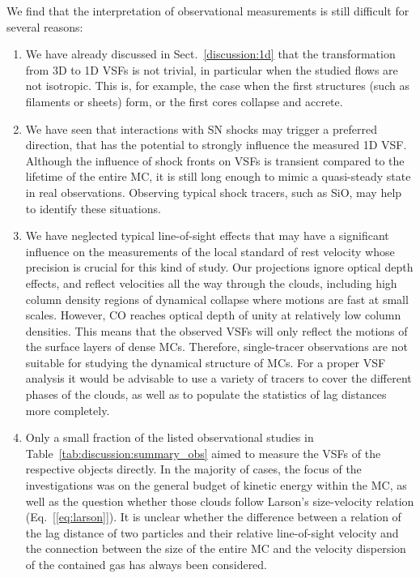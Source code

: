 We find that the interpretation of observational measurements is still difficult for several reasons:
\begin{enumerate}
\item We have already discussed in Sect.~\ref{discussion:1d} that the transformation from 3D to 1D VSFs is not trivial, in particular when the studied flows are not isotropic.
This is, for example, the case when the first structures (such as filaments or sheets) form, or the first cores collapse and accrete.
\item We have seen that interactions with SN shocks may trigger a preferred direction, that has the potential to strongly influence the measured 1D VSF.
Although the influence of shock fronts on VSFs is transient compared to the lifetime of the entire MC, it is still long enough to mimic a quasi-steady state in real observations.
Observing typical shock tracers, such as SiO, may help to identify these situations. 
\item We have neglected typical line-of-sight effects that may have a significant influence on the measurements of the local standard of rest velocity whose precision is crucial for this kind of study.
Our projections ignore optical depth effects, and reflect velocities all the way through the clouds, including high column density regions of dynamical collapse where motions are fast at small scales.  However, CO reaches optical depth of unity at relatively low column densities. This means that the observed VSFs will only reflect the motions of the surface layers of dense MCs.  
Therefore, single-tracer observations are not suitable for studying the dynamical structure of MCs. 
For a proper VSF analysis it would be advisable to use a variety of tracers to cover the different phases of the clouds, as well as to populate the statistics of lag distances more completely.
\item Only a small fraction of the listed observational studies in Table~\ref{tab:discussion:summary_obs} aimed to measure the VSFs of the respective objects directly.
In the majority of cases, the focus of the investigations was on the general budget of kinetic energy within the MC, as well as the question whether those clouds follow Larson's size-velocity relation (Eq.~[\ref{eq:larson}]).
It is unclear whether the difference between a relation of the lag distance of two particles and their relative line-of-sight velocity and the connection between the size of the entire MC and the velocity dispersion of the contained gas has always been considered.
\end{enumerate}

